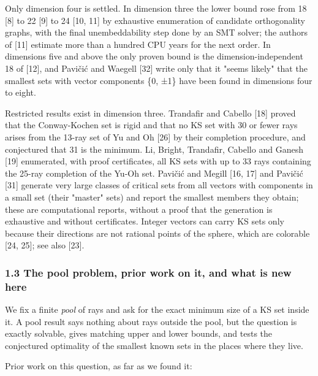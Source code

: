 \documentclass[11pt,a4paper]{article}
\begin{document}
Only dimension four is settled. In dimension three the lower bound rose from 18 {[}8{]} to 22 {[}9{]} to 24
{[}10, 11{]} by exhaustive enumeration of candidate orthogonality graphs, with the final unembeddability
step done by an SMT solver; the authors of {[}11{]} estimate more than a hundred CPU years for the next
order. In dimensions five and above the only proven bound is the dimension-independent 18 of {[}12{]}, and
Pavičić and Waegell {[}32{]} write only that it "seems likely" that the smallest sets with vector components \{0, ±1\} have been found in dimensions four to
eight.

Restricted results exist in dimension three. Trandafir and Cabello {[}18{]} proved that the Conway-Kochen
set is rigid and that no KS set with 30 or fewer rays arises from the 13-ray set of Yu and Oh {[}26{]} by
their completion procedure, and conjectured that 31 is the minimum. Li, Bright, Trandafir, Cabello and
Ganesh {[}19{]} enumerated, with proof certificates, all KS sets with up to 33 rays containing the 25-ray
completion of the Yu-Oh set. Pavičić and Megill {[}16, 17{]} and Pavičić {[}31{]} generate very large classes
of critical sets from all vectors with components in a small set (their "master" sets) and report the
smallest members they obtain; these are computational reports, without a proof that the generation is
exhaustive and without certificates. Integer vectors can carry KS sets only because their directions
are not rational points of the sphere, which are colorable {[}24, 25{]}; see also {[}23{]}.

\subsubsection{1.3 The pool problem, prior work on it, and what is new here}\label{13-the-pool-problem-prior-work-on-it-and-what-is-new-here}

We fix a finite \emph{pool} of rays and ask for the exact minimum size of a KS set inside it. A pool result
says nothing about rays outside the pool, but the question is exactly solvable, gives matching upper
and lower bounds, and tests the conjectured optimality of the smallest known sets in the places where
they live.

Prior work on this question, as far as we found it:
\end{document}

